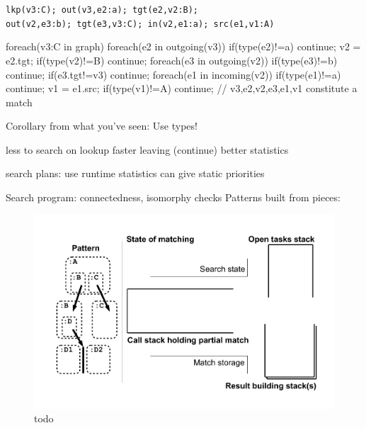 \texttt{lkp(v3:C); out(v3,e2:a); tgt(e2,v2:B);}\\
\texttt{out(v2,e3:b); tgt(e3,v3:C); in(v2,e1:a); src(e1,v1:A)}

\begin{csharp}
foreach(v3:C in graph) {
	foreach(e2 in outgoing(v3)) {
		if(type(e2)!=a) continue;
		v2 = e2.tgt;
		if(type(v2)!=B) continue;
		foreach(e3 in outgoing(v2)) {
			if(type(e3)!=b) continue;
			if(e3.tgt!=v3) continue;
				foreach(e1 in incoming(v2)) {
				if(type(e1)!=a) continue;
				v1 = e1.src;
				if(type(v1)!=A) continue;
				// v3,e2,v2,e3,e1,v1 constitute a match
			} 
		}
	}
}
\end{csharp}

\begin{note}
Corollary from what you've seen: Use types!

less to search on lookup
faster leaving (continue)
better statistics

search plans:
use runtime statistics
can give static priorities
\end{note}

Search program:
connectedness, isomorphy checks
Patterns built from pieces:

\pagebreak

\begin{figure}[htbp]
  \centering
  \includegraphics[width=\textwidth]{fig/Passungszustand1}
  \caption{todo}
  \label{figmatchingstate1}
\end{figure}

